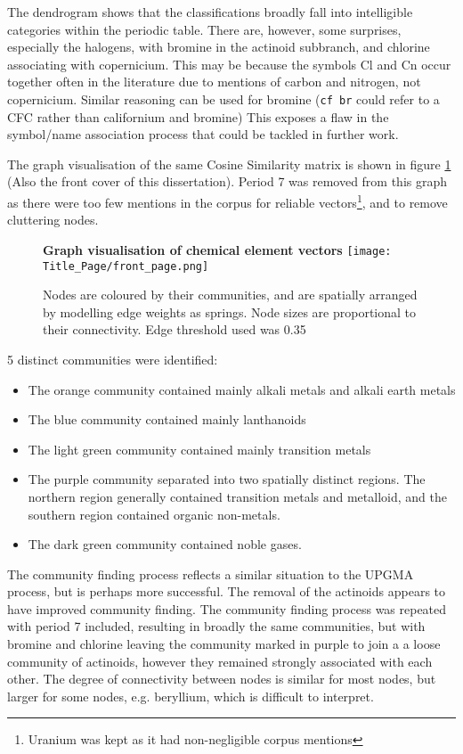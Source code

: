 The dendrogram shows that the classifications broadly fall into intelligible categories within the periodic table. There are, however, some surprises, especially the halogens, with bromine in  the actinoid subbranch, and chlorine associating with copernicium. This may be because the symbols Cl and Cn occur together often in the literature due to mentions of carbon and nitrogen, not copernicium. Similar reasoning can be used for bromine (\texttt{cf br} could refer to a CFC rather than californium and bromine) This exposes a flaw in the symbol/name association process that could be tackled in further work.

The graph visualisation of the same Cosine Similarity matrix is shown in figure \ref{fig:elems_graph} (Also the front cover of this dissertation). Period 7 was removed from this graph as there were too few mentions in the corpus for reliable vectors\footnote{Uranium was kept as it had non-negligible corpus mentions}, and to remove cluttering nodes.

\begin{center}
\begin{figure}[H]
  \centering
  \textbf{Graph visualisation of chemical element vectors}
    \texttt{[image: Title\_Page/front\_page.png]}
    \caption[Graph Visualisation of Chemical Element Vectors]{Nodes are coloured by their communities, and are spatially arranged by modelling edge weights as springs. Node sizes are proportional to their connectivity. Edge threshold used was 0.35 }
    \label{fig:elems_graph}
\end{figure} 
\end{center}
5 distinct communities were identified:
\begin{itemize}
\itemsep-0.5em
\item The orange community contained mainly alkali metals and alkali earth metals
\item The blue community contained mainly lanthanoids
\item The light green community contained mainly transition metals
\item The purple community separated into two spatially distinct regions. The northern region generally contained transition metals and metalloid, and the southern region contained organic non-metals.
\item The dark green community contained noble gases.
\end{itemize}
The community finding process reflects a similar situation to the UPGMA process, but is perhaps more successful. The removal of the actinoids appears to have improved community finding. The community finding process was repeated with period 7 included, resulting in broadly the same communities, but with bromine and chlorine leaving the community marked in purple to join a a loose community of actinoids, however they remained strongly associated with each other. The degree of connectivity between nodes is similar for most nodes, but larger for some nodes, e.g. beryllium, which is difficult to interpret. 

